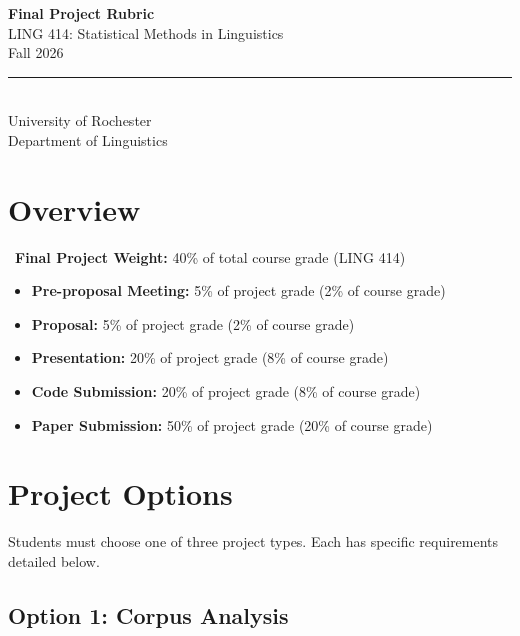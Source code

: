 \documentclass[10pt,letterpaper]{article}
\begin{document}
\begin{center}
\colorbox{primaryblue}{\parbox{0.94\textwidth}{%
\vspace{0.34cm}
\begin{center}
  \color{white}
  {\LARGE\bfseries Final Project Rubric}\\[0.18em]
  {\normalsize LING 414: Statistical Methods in Linguistics}\\[0.15em]
  {\normalsize Fall 2026}\\[0.25em]
  \rule{0.42\textwidth}{0.4pt}\\[0.18em]
  {\small University of Rochester}\\
  {\small Department of Linguistics}
\end{center}
\vspace{0.34cm}
}}
\end{center}

\section{Overview}

\begin{bluebox}
\faInfoCircle\ \textbf{Final Project Weight:} 40\% of total course grade (LING 414)
\begin{itemize}
  \item \textbf{Pre-proposal Meeting:} 5\% of project grade (2\% of course grade)
  \item \textbf{Proposal:} 5\% of project grade (2\% of course grade)
  \item \textbf{Presentation:} 20\% of project grade (8\% of course grade)
  \item \textbf{Code Submission:} 20\% of project grade (8\% of course grade)
  \item \textbf{Paper Submission:} 50\% of project grade (20\% of course grade)
\end{itemize}
\end{bluebox}

\section{Project Options}

Students must choose one of three project types. Each has specific requirements detailed below.

\subsection{Option 1: Corpus Analysis}
\end{document}
